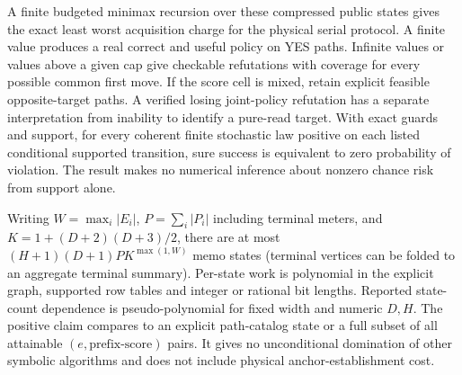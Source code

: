 \begin{theorem}\label{ext:t30cg2}

A finite budgeted minimax recursion over these compressed public states gives the exact least worst acquisition charge for the physical serial protocol. A finite value produces a real correct and useful policy on YES paths. Infinite values or values above a given cap give checkable refutations with coverage for every possible common first move. If the score cell is mixed, retain explicit feasible opposite-target paths. A verified losing joint-policy refutation has a separate interpretation from inability to identify a pure-read target. With exact guards and support, for every coherent finite stochastic law positive on each listed conditional supported transition, sure success is equivalent to zero probability of violation. The result makes no numerical inference about nonzero chance risk from support alone.

Writing \(W=\max_i |E_i|\), \(P=\sum_i |P_i|\) including terminal meters, and \(K=1+(D+2)(D+3)/2\), there are at most \((H+1)(D+1)P K^{\max(1,W)}\) memo states (terminal vertices can be folded to an aggregate terminal summary). Per-state work is polynomial in the explicit graph, supported row tables and integer or rational bit lengths. Reported state-count dependence is pseudo-polynomial for fixed width and numeric \(D,H\). The positive claim compares to an explicit path-catalog state or a full subset of all attainable \((e,\text{prefix-score})\) pairs. It gives no unconditional domination of other symbolic algorithms and does not include physical anchor-establishment cost.

\end{theorem}

